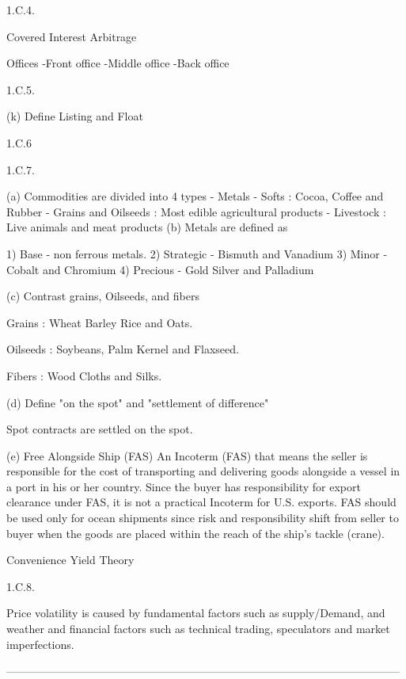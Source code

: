 1.C.4.

Covered Interest Arbitrage

Offices
-Front office
-Middle office
-Back office

1.C.5.

(k) 
Define Listing and Float

1.C.6


1.C.7.

(a) 
Commodities are divided into 4 types
- Metals
- Softs : Cocoa, Coffee and Rubber
- Grains and Oilseeds : Most edible agricultural products
- Livestock : Live animals and meat products
(b)
Metals are defined as

1) Base - non ferrous metals.
2) Strategic  - Bismuth and Vanadium
3) Minor - Cobalt and Chromium
4) Precious - Gold Silver and Palladium

(c)
Contrast grains, Oilseeds, and fibers

Grains : Wheat Barley Rice and Oats.

Oilseeds : Soybeans, Palm Kernel and Flaxseed.

Fibers : Wood Cloths and Silks.


(d)
Define "on the spot" and "settlement of difference"

Spot contracts are settled on the spot.

(e) 
Free Alongside Ship (FAS)
An Incoterm (FAS) that means the seller is responsible for the cost of transporting and delivering goods alongside a vessel
in a port in his or her country. Since the buyer has responsibility for export clearance under FAS, it is not a practical 
Incoterm for U.S. exports. FAS should be used only for ocean shipments since risk and responsibility shift from seller to 
buyer when the goods are placed within the reach of the ship's tackle (crane).

Convenience Yield Theory


1.C.8.

Price volatility is caused by fundamental factors such as supply/Demand, and weather and financial factors
such as technical trading, speculators and market imperfections.


-----------------------------------------------------------------------------------------------------------
